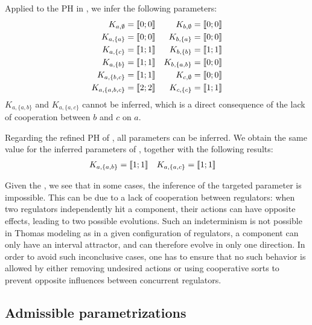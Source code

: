 \begin{example}
\label{ex:infer-param-runningPH-1}

Applied to the PH in , we infer the following parameters:
\begin{align*}
K_{a, \emptyset} &= \llbracket 0 ; 0 \rrbracket &
K_{b, \emptyset} &= \llbracket 0 ; 0 \rrbracket \\
K_{a, \{a\}} &= \llbracket 0 ; 0 \rrbracket &
K_{b, \{a\}} &= \llbracket 0 ; 0 \rrbracket \\
K_{a, \{c\}} &= \llbracket 1 ; 1 \rrbracket &
K_{b, \{b\}} &= \llbracket 1 ; 1 \rrbracket \\
K_{a, \{b\}} &= \llbracket 1 ; 1 \rrbracket &
K_{b, \{a,b\}} &= \llbracket 0 ; 0 \rrbracket \\
K_{a, \{b,c\}} &= \llbracket 1 ; 1 \rrbracket &
K_{c, \emptyset} &= \llbracket 0 ; 0 \rrbracket \\
K_{a, \{a,b,c\}} &= \llbracket 2 ; 2 \rrbracket &
K_{c, \{c\}} &= \llbracket 1 ; 1 \rrbracket
\end{align*}
$K_{a,\{a,b\}}$ and $K_{a,\{a,c\}}$ cannot be inferred,
which is a direct consequence of the lack of cooperation between $b$ and $c$ on $a$.
\end{example}

\begin{example}
Regarding the refined PH of , all parameters can be inferred.
We obtain the same value for the inferred parameters of ,
together with the following results:
\begin{align*}
  K_{a,\{a,b\}} &= \llbracket 1 ; 1 \rrbracket &
  K_{a,\{a,c\}} &= \llbracket 1 ; 1 \rrbracket
\end{align*}
\end{example}

Given the , we see that in some cases, the inference of the targeted parameter is impossible.
This can be due to a lack of cooperation between regulators:
when two regulators independently hit a component, their actions can have opposite effects, leading to two possible evolutions.
Such an indeterminism is not possible in Thomas modeling as in a given configuration of regulators,
a component can only have an interval attractor, and can therefore evolve in only one direction.
In order to avoid such inconclusive cases, one has to ensure that no such behavior is allowed by
either removing undesired actions or using cooperative sorts to prevent opposite influences between
concurrent regulators.

\subsection{Admissible parametrizations}\label{ssec:admissible-K}

